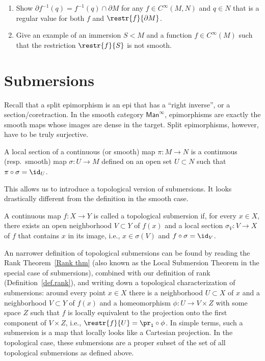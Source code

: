 \begin{xca}
\begin{enumerate}
    \item Show $\partial f^{-1}(q)=f^{-1}(q)\cap \partial M$ for any $f\in C^\infty(M,N)$ and $q\in N$ that is a regular value for both $f$ and $\restr{f}{\partial M}$.
    \item Give an example of an immersion $S<M$ and a function $f\in C^\infty(M)$ such that the restriction $\restr{f}{S}$ is not smooth.
\end{enumerate}

\end{xca}




\section{Submersions}\label{sec: submersions}

Recall that a split epimorphism is an epi that has a ``right inverse'', or a section/coretraction. In the smooth category $\mathsf{Man}^\infty$, epimorphisms are exactly the smooth maps whose images are dense in the target. Split epimorphisms, however, have to be truly surjective.

\begin{defn}
A local section of a continuous (or smooth) map $\pi:M\to N$ is a continuous (resp.~smooth) map $\sigma :U\to M$ defined on an open set $U\subset N$ such that $\pi\circ\sigma =\id_U$.
\end{defn}

This allows us to introduce a topological version of submersions. It looks drastically different from the definition in the smooth case.

\begin{defn}
    A continuous map $f:X\to Y$ is called a topological submersion if, for every $x\in X$, there exists an open neighborhood $V\subset Y$ of $f(x)$ and a local section $\sigma_V:V\to X$ of $f$ that contains $x$ in its image, i.e., $x\in \sigma(V)$ and $f\circ\sigma=\id_V$. 
\end{defn}

An narrower definition of topological submersions can be found by reading the Rank Theorem~\ref{Rank thm} (also known as the Local Submersion Theorem in the special case of submersions), combined with our definition of rank (Definition~\ref{def.rank}), and writing down a topological characterization of submersions: around every point $x\in X$ there is a neighborhood $U\subset X$ of $x$ and a neighborhood $V\subset Y$ of $f(x)$ and a homeomorphism $\phi:U\to V\times Z$ with some space $Z$ such that $f$ is locally equivalent to the projection onto the first component of $V\times Z$, i.e., $\restr{f}{U}=\pr_1\circ \phi$. In simple terms, such a submersion is a map that locally looks like a Cartesian projection. In the topological case, these submersions are a proper subset of the set of all topological submersions as defined above.

